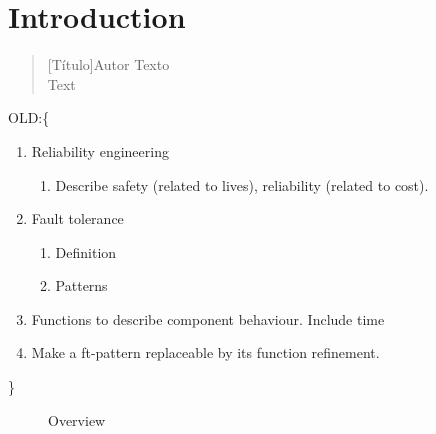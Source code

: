 \chapter{Introduction}

\begin{quotation}[Título]{Autor}
Texto \\
Text
\end{quotation}

\noindent OLD:\{
\begin{enumerate}
  \item Reliability engineering
  \begin{enumerate}
    \item Describe safety (related to lives), reliability (related to cost).
  \end{enumerate}
  \item Fault tolerance
  \begin{enumerate}
    \item Definition
    \item Patterns
  \end{enumerate}
  \item Functions to describe component behaviour. Include time
  \item Make a ft-pattern replaceable by its function refinement.
\end{enumerate}
\}

\begin{figure}[htp]
\begin{center}
  
  \caption{Overview}
  \label{fig:overview}
\end{center}
\end{figure}